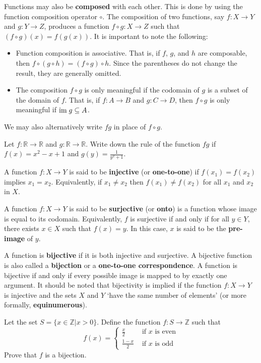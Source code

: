 Functions may also be \textbf{composed} with each other. This is done by using the function composition operator $\circ$. The composition of two functions, say $f: X \to Y$ and $g: Y \to Z$, produces a function $f \circ g: X \to Z$ such that $(f \circ g)(x) = f(g(x))$. It is important to note the following:
\begin{itemize}
    \item Function composition is associative. That is, if $f$, $g$, and $h$ are composable, then $f \circ (g \circ h) = (f \circ g) \circ h$. Since the parentheses do not change the result, they are generally omitted.
    \item The composition $f \circ g$ is only meaningful if the codomain of $g$ is a subset of the domain of $f$. That is, if $f: A \to B$ and $g: C \to D$, then $f \circ g$ is only meaningful if $\mathrm{im}\; g \subseteq A$.
\end{itemize}
We may also alternatively write $fg$ in place of $f \circ g$.

\begin{exercise}
    Let $f: \mathbb{R} \to \mathbb{R}$ and $g: \mathbb{R} \to \mathbb{R}$. Write down the rule of the function $fg$ if $f(x) = x^2 - x + 1$ and $g(y) = \frac1{y^2+1}$.
\end{exercise}

A function $f: X \to Y$ is said to be \textbf{injective} (or \textbf{one-to-one}) if $f(x_1) = f(x_2)$ implies $x_1 = x_2$. Equivalently, if $x_1 \neq x_2$ then $f(x_1) \neq f(x_2)$ for all $x_1$ and $x_2$ in $X$.

A function $f: X \to Y$ is said to be \textbf{surjective} (or \textbf{onto}) is a function whose image is equal to its codomain. Equivalently, $f$ is surjective if and only if for all $y \in Y$, there exists $x \in X$ such that $f(x) = y$. In this case, $x$ is said to be the \textbf{pre-image} of $y$.

A function is \textbf{bijective} if it is both injective and surjective. A bijective function is also called a \textbf{bijection} or a \textbf{one-to-one correspondence}. A function is bijective if and only if every possible image is mapped to by exactly one argument. It should be noted that bijectivity is implied if the function $f: X \to Y$ is injective and the sets $X$ and $Y$ `have the same number of elements' (or more formally, \textbf{equinumerous}).

\begin{exercise}
    Let the set $S = \{x \in \mathbb{Z} \vert x > 0\}$. Define the function $f: S \to \mathbb{Z}$ such that
    \[
        f(x) = \begin{cases}
            \frac{x}{2} & \text{ if } x \text{ is even}\\
            \frac{1-x}{2} & \text{ if } x \text{ is odd} 
        \end{cases}
    \]
    Prove that $f$ is a bijection.
\end{exercise}

